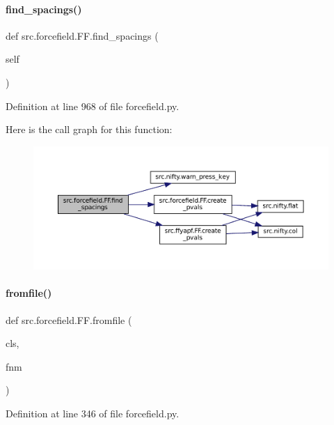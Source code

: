 \paragraph{\texorpdfstring{find\+\_\+spacings()}{find\_spacings()}}
{\footnotesize\ttfamily def src.\+forcefield.\+F\+F.\+find\+\_\+spacings (\begin{DoxyParamCaption}\item[{}]{self }\end{DoxyParamCaption})}



Definition at line 968 of file forcefield.\+py.

Here is the call graph for this function\+:
\nopagebreak
\begin{figure}[H]
\begin{center}
\leavevmode
\includegraphics[width=350pt]{classsrc_1_1forcefield_1_1FF_a477e27c784066adde54ab153542bc2a5_cgraph}
\end{center}
\end{figure}
\mbox{\label{classsrc_1_1forcefield_1_1FF_a92b3b4ead5fda0434addbda3794201ce}} 
\paragraph{\texorpdfstring{fromfile()}{fromfile()}}
{\footnotesize\ttfamily def src.\+forcefield.\+F\+F.\+fromfile (\begin{DoxyParamCaption}\item[{}]{cls,  }\item[{}]{fnm }\end{DoxyParamCaption})}



Definition at line 346 of file forcefield.\+py.

\mbox{\label{classsrc_1_1forcefield_1_1FF_a23ac17f14551fb1c32bd72b37ba38a48}} 
